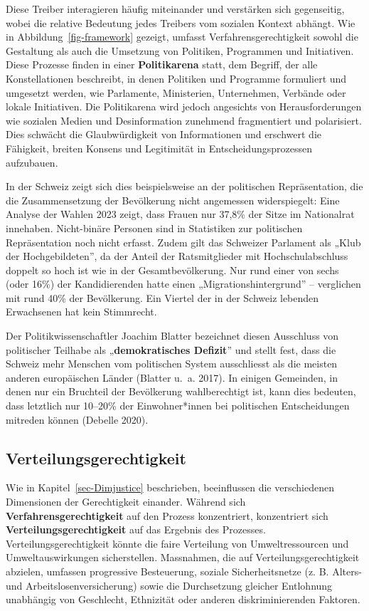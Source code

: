 \documentclass[
  nswissgerman,
  a4paper,
  openany]{book}
\begin{document}
Diese Treiber interagieren häufig miteinander und verstärken sich
gegenseitig, wobei die relative Bedeutung jedes Treibers vom sozialen
Kontext abhängt. Wie in Abbildung~\ref{fig-framework} gezeigt, umfasst
Verfahrensgerechtigkeit sowohl die Gestaltung als auch die Umsetzung von
Politiken, Programmen und Initiativen. Diese Prozesse finden in einer
\textbf{Politikarena} statt, dem Begriff, der alle Konstellationen
beschreibt, in denen Politiken und Programme formuliert und umgesetzt
werden, wie Parlamente, Ministerien, Unternehmen, Verbände oder lokale
Initiativen. Die Politikarena wird jedoch angesichts von
Herausforderungen wie sozialen Medien und Desinformation zunehmend
fragmentiert und polarisiert. Dies schwächt die Glaubwürdigkeit von
Informationen und erschwert die Fähigkeit, breiten Konsens und
Legitimität in Entscheidungsprozessen aufzubauen.

In der Schweiz zeigt sich dies beispielsweise an der politischen
Repräsentation, die die Zusammensetzung der Bevölkerung nicht angemessen
widerspiegelt: Eine Analyse der Wahlen 2023 zeigt, dass Frauen nur
37,8\% der Sitze im Nationalrat innehaben. Nicht-binäre Personen sind in
Statistiken zur politischen Repräsentation noch nicht erfasst. Zudem
gilt das Schweizer Parlament als „Klub der Hochgebildeten'', da der
Anteil der Ratsmitglieder mit Hochschulabschluss doppelt so hoch ist wie
in der Gesamtbevölkerung. Nur rund einer von sechs (oder 16\%) der
Kandidierenden hatte einen „Migrationshintergrund'' -- verglichen mit
rund 40\% der Bevölkerung. Ein Viertel der in der Schweiz lebenden
Erwachsenen hat kein Stimmrecht.

Der Politikwissenschaftler Joachim Blatter bezeichnet diesen Ausschluss
von politischer Teilhabe als „\textbf{demokratisches Defizit}'' und
stellt fest, dass die Schweiz mehr Menschen vom politischen System
ausschliesst als die meisten anderen europäischen Länder (Blatter u.~a.
2017). In einigen Gemeinden, in denen nur ein Bruchteil der Bevölkerung
wahlberechtigt ist, kann dies bedeuten, dass letztlich nur 10--20\% der
Einwohner*innen bei politischen Entscheidungen mitreden können (Debelle
2020).

\subsection{Verteilungsgerechtigkeit}\label{verteilungsgerechtigkeit}

Wie in Kapitel~\ref{sec-Dimjustice} beschrieben, beeinflussen die
verschiedenen Dimensionen der Gerechtigkeit einander. Während sich
\textbf{Verfahrensgerechtigkeit} auf den Prozess konzentriert,
konzentriert sich \textbf{Verteilungsgerechtigkeit} auf das Ergebnis des
Prozesses. Verteilungsgerechtigkeit könnte die faire Verteilung von
Umweltressourcen und Umweltauswirkungen sicherstellen. Massnahmen, die
auf Verteilungsgerechtigkeit abzielen, umfassen progressive Besteuerung,
soziale Sicherheitsnetze (z. B. Alters- und Arbeitslosenversicherung)
sowie die Durchsetzung gleicher Entlohnung unabhängig von Geschlecht,
Ethnizität oder anderen diskriminierenden Faktoren.
\end{document}
